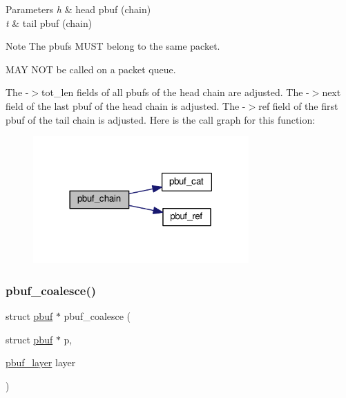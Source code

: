\begin{DoxyParams}{Parameters}
{\em h} & head pbuf (chain) \\
\hline
{\em t} & tail pbuf (chain) \\
\hline
\end{DoxyParams}
\begin{DoxyNote}{Note}
The pbufs M\+U\+ST belong to the same packet. 

M\+AY N\+OT be called on a packet queue.
\end{DoxyNote}
The -\/$>$tot\+\_\+len fields of all pbufs of the head chain are adjusted. The -\/$>$next field of the last pbuf of the head chain is adjusted. The -\/$>$ref field of the first pbuf of the tail chain is adjusted. Here is the call graph for this function\+:
\nopagebreak
\begin{figure}[H]
\begin{center}
\leavevmode
\includegraphics[width=234pt]{group__pbuf_ga831c9a72bda1d3bd4c7b96f5a0e3b891_cgraph}
\end{center}
\end{figure}
\mbox{\label{group__pbuf_ga031469589fa95ece3bf1c136d1509eac}} 
\subsubsection{\texorpdfstring{pbuf\+\_\+coalesce()}{pbuf\_coalesce()}}
{\footnotesize\ttfamily struct \hyperlink{structpbuf}{pbuf} $\ast$ pbuf\+\_\+coalesce (\begin{DoxyParamCaption}\item[{struct \hyperlink{structpbuf}{pbuf} $\ast$}]{p,  }\item[{\hyperlink{group__pbuf_gaee1baa59bb2f85ba575b5a8619ac1ebf}{pbuf\+\_\+layer}}]{layer }\end{DoxyParamCaption})}

